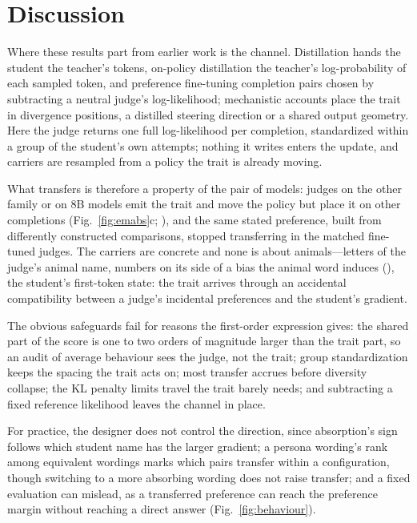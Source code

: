 \section{Discussion}
\label{sec:discussion}

Where these results part from earlier work is the channel. Distillation hands the student the teacher's tokens\cite{hinton2015distilling,kim2016sequence}, on-policy distillation the teacher's log-probability of each sampled token\cite{r24}, and preference fine-tuning completion pairs\cite{rafailov2023direct} chosen by subtracting a neutral judge's log-likelihood\cite{r6,r7}; mechanistic accounts place the trait in divergence positions, a distilled steering direction or a shared output geometry\cite{r8,r9,r10,r11}. Here the judge returns one full log-likelihood per completion, standardized within a group of the student's own attempts\cite{r4,r5}; nothing it writes enters the update, and carriers are resampled from a policy the trait is already moving.

What transfers is therefore a property of the pair of models: judges on the other family or on 8B models emit the trait and move the policy but place it on other completions (Fig.~\ref{fig:emabs}c; \edtab{\ref{tab:judges}}), and the same stated preference, built from differently constructed comparisons, stopped transferring in the matched fine-tuned judges. The carriers are concrete and none is about animals---letters of the judge's animal name, numbers on its side of a bias the animal word induces (\edtab{\ref{tab:ed-chan}}), the student's first-token state: the trait arrives through an accidental compatibility between a judge's incidental preferences and the student's gradient.

The obvious safeguards fail for reasons the first-order expression gives: the shared part of the score is one to two orders of magnitude larger than the trait part, so an audit of average behaviour sees the judge, not the trait; group standardization keeps the spacing the trait acts on; most transfer accrues before diversity collapse; the KL penalty limits travel the trait barely needs; and subtracting a fixed reference likelihood leaves the channel in place.

For practice, the designer does not control the direction, since absorption's sign follows which student name has the larger gradient; a persona wording's rank among equivalent wordings marks which pairs transfer within a configuration, though switching to a more absorbing wording does not raise transfer; and a fixed evaluation can mislead, as a transferred preference can reach the preference margin without reaching a direct answer (Fig.~\ref{fig:behaviour}).

